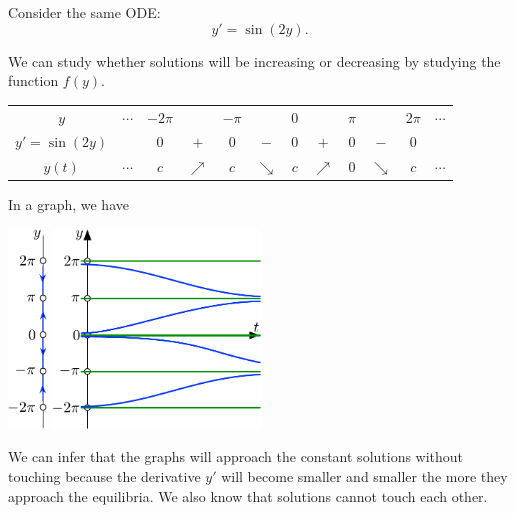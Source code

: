 \begin{example}
Consider the same ODE:
$$
y'=\sin(2y).
$$

We can study whether solutions will be increasing or decreasing by studying the function $f(y)$.

\begin{center}
\begin{tabular}{c|ccccccccccc}
$y$ & $\cdots$ & $-2\pi$ & & $-\pi$ & & $0$ & & $\pi$ & & $2\pi$ & $\cdots$ \\[5pt]%
$y'=\sin(2y)$ & & $0$ & $+$ & $0$ & $-$ & $0$ & $+$ & $0$ & $-$ & $0$ & \\[5pt]\hline\hline
$y(t)$ & $\cdots$ & $c$ & $\nearrow$ & $c$ & $\searrow$ & $c$ & $\nearrow$ & $0$ & $\searrow$ & $c$ & $\cdots$
\end{tabular}	
\end{center}

In a graph, we have
\begin{center}
	\includegraphics[height=150pt]{images/module14-equil1.pdf}
	\quad 
	\includegraphics[height=150pt]{images/module14-equil2.pdf}
\end{center}

We can infer that the graphs will approach the constant solutions without touching because the derivative $y'$ will become smaller and smaller the more they approach the equilibria. We also know that solutions cannot touch each other.
\end{example}


